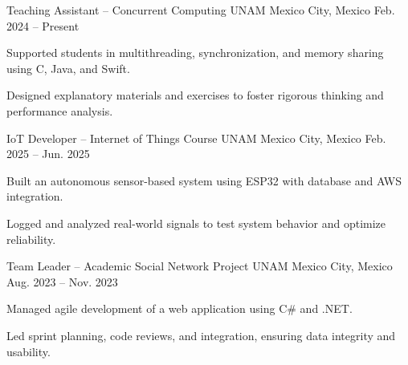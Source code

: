 \begin{cventries}

  \cventry
    {Teaching Assistant – Concurrent Computing}
    {UNAM}
    {Mexico City, Mexico}
    {Feb. 2024 -- Present}
    {
      \begin{cvitems}
        \item {Supported students in multithreading, synchronization, and memory sharing using C, Java, and Swift.}
        \item {Designed explanatory materials and exercises to foster rigorous thinking and performance analysis.}
      \end{cvitems}
    }

  \cventry
    {IoT Developer – Internet of Things Course}
    {UNAM}
    {Mexico City, Mexico}
    {Feb. 2025 -- Jun. 2025}
    {
      \begin{cvitems}
        \item {Built an autonomous sensor-based system using ESP32 with database and AWS integration.}
        \item {Logged and analyzed real-world signals to test system behavior and optimize reliability.}
      \end{cvitems}
    }

  \cventry
    {Team Leader – Academic Social Network Project}
    {UNAM}
    {Mexico City, Mexico}
    {Aug. 2023 -- Nov. 2023}
    {
      \begin{cvitems}
        \item {Managed agile development of a web application using C\# and .NET.}
        \item {Led sprint planning, code reviews, and integration, ensuring data integrity and usability.}
      \end{cvitems}
    }

\end{cventries}
